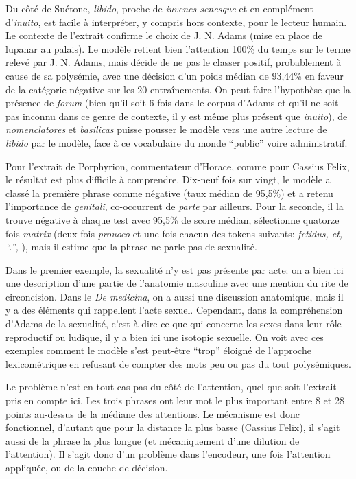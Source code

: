 Du côté de Suétone, \textit{libido}, proche de \textit{iuvenes senesque} et en complément d'\textit{inuito}, est facile à interpréter, y compris hors contexte, pour le lecteur humain. Le contexte de l'extrait confirme le choix de J. N. Adams (mise en place de lupanar au palais). Le modèle retient bien l'attention 100\% du temps sur le terme relevé par J. N. Adams, mais décide de ne pas le classer positif, probablement à cause de sa polysémie, avec une décision d'un poids médian de 93,44\% en faveur de la catégorie négative sur les 20 entraînements. On peut faire l'hypothèse que la présence de \textit{forum} (bien qu'il soit 6 fois dans le corpus d'Adams et qu'il ne soit pas inconnu dans ce genre de contexte, il y est même plus présent que \textit{inuito}), de \textit{nomenclatores} et \textit{basilicas} puisse pousser le modèle vers une autre lecture de \textit{libido} par le modèle, face à ce vocabulaire du monde \enquote{public} voire administratif.

Pour l'extrait de Porphyrion, commentateur d'Horace, comme pour Cassius Felix, le résultat est plus difficile à comprendre. Dix-neuf fois sur vingt, le modèle a classé la première phrase comme négative  (taux médian de 95,5\%) et a retenu l'importance de \textit{genitali}, co-occurrent de \textit{parte} par ailleurs. Pour la seconde, il la trouve négative à chaque test avec 95,5\% de score médian, sélectionne quatorze fois \textit{matrix} (deux fois \textit{prouoco} et une fois chacun des tokens suivants: \textit{fetidus, et, \enquote{.}, }), mais il estime que la phrase ne parle pas de sexualité.

Dans le premier exemple, la sexualité n'y est pas présente par acte: on a bien ici une description d'une partie de l'anatomie masculine avec une mention du rite de circoncision. Dans le \textit{De medicina}, on a aussi une discussion anatomique, mais il y a des éléments qui rappellent l'acte sexuel. Cependant, dans la compréhension d'Adams de la sexualité, c'est-à-dire ce que qui concerne les sexes dans leur rôle reproductif ou ludique, il y a bien ici une isotopie sexuelle. On voit avec ces exemples comment le modèle s'est peut-être \enquote{trop} éloigné de l'approche lexicométrique en refusant de compter des mots peu ou pas du tout polysémiques.

Le problème n'est en tout cas pas du côté de l'attention, quel que soit l'extrait pris en compte ici. Les trois phrases ont leur mot le plus important entre 8 et 28 points au-dessus de la médiane des attentions. Le mécanisme est donc fonctionnel, d'autant que pour la distance la plus basse (Cassius Felix), il s'agit aussi de la phrase la plus longue (et mécaniquement d'une dilution de l'attention). Il s'agit donc d'un problème dans l'encodeur, une fois l'attention appliquée, ou de la couche de décision.

